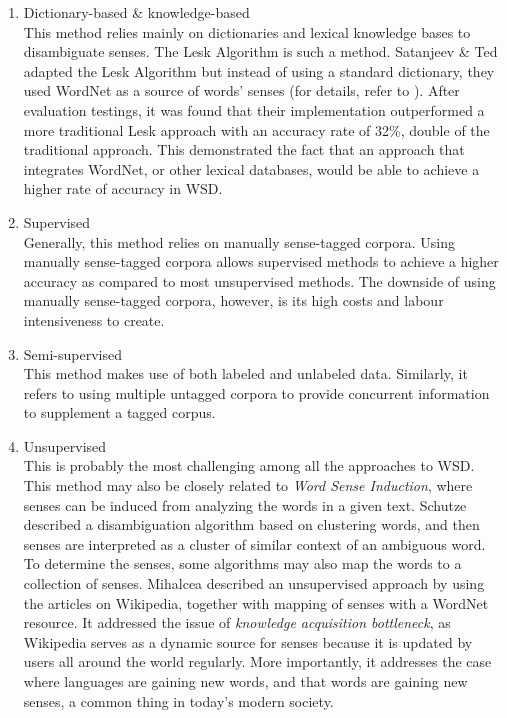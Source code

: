 \documentclass[12 pt]{article}
\begin{document}
\begin{enumerate}
\item{Dictionary-based \& knowledge-based \\ This method relies mainly on dictionaries and lexical knowledge bases to disambiguate senses. The Lesk Algorithm \cite{michaellesk} is such a method. Satanjeev \& Ted adapted the Lesk Algorithm but instead of using a standard dictionary, they used WordNet \cite{wordnet} as a source of words' senses (for details, refer to \cite{lesk}). After evaluation testings, it was found that their implementation outperformed a more traditional Lesk approach with an accuracy rate of 32\%, double of the traditional approach. This demonstrated the fact that an approach that integrates WordNet, or other lexical databases, would be able to achieve a higher rate of accuracy in WSD.}
\item{Supervised \\ Generally, this method relies on manually sense-tagged corpora. Using manually sense-tagged corpora allows supervised methods to achieve a higher accuracy as compared to most unsupervised methods. The downside of using manually sense-tagged corpora, however, is its high costs and labour intensiveness to create.}
\item{Semi-supervised \\
This method makes use of both labeled and unlabeled data. Similarly, it refers to using multiple untagged corpora to provide concurrent information to supplement a tagged corpus.}
\item{Unsupervised \\ This is probably the most challenging among all the approaches to WSD. This method may also be closely related to \textit{Word Sense Induction}, where senses can be induced from analyzing the words in a given text. Schutze \cite{hinrich} described a disambiguation algorithm based on clustering words, and then senses are interpreted as a cluster of similar context of an ambiguous word. To determine the senses, some algorithms may also map the words to a collection of senses. Mihalcea \cite{wikipedia} described an unsupervised approach by using the articles on Wikipedia, together with mapping of senses with a WordNet resource. It addressed the issue of \textit{knowledge acquisition bottleneck}, as Wikipedia serves as a dynamic source for senses because it is updated by users all around the world regularly. More importantly, it addresses the case where languages are gaining new words, and that words are gaining new senses, a common thing in today's modern society.}
\end{enumerate}
\end{document}
